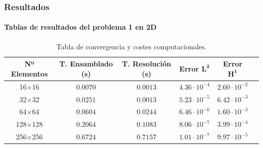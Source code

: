\documentclass[compress]{beamer}
\begin{document}
\begin{frame}
	\frametitle{Resultados}
	\framesubtitle{Tablas de resultados del problema 1 en 2D}
	\scriptsize
	\begin{table}[htbp]
		\centering
		\setlength{\tabcolsep}{4pt} %
		\caption{Tabla de convergencia y costes computacionales.}
		\vspace{-0.2cm}
		\begin{tabular}{cccccc}
			\toprule
			\textbf{Nº Elementos} & \textbf{T. Ensamblado (s)} & \textbf{T. Resolución (s)} & \textbf{Error} $\boldsymbol{L^2}$ & \textbf{Error} $\boldsymbol{H^1}$ \\
			\midrule
			16$\times$16  & $0.0070$ & $0.0013$ & $4.36 \cdot 10^{-4}$ & $2.60 \cdot 10^{-2}$ \\
			32$\times$32  & $0.0251$ & $0.0013$ & $5.23 \cdot 10^{-5}$ & $6.42 \cdot 10^{-3}$ \\
			64$\times$64  & $0.0604$ & $0.0244$ & $6.46 \cdot 10^{-6}$ & $1.60 \cdot 10^{-3}$ \\
			128$\times$128 & $0.2064$ & $0.1083$ & $8.06 \cdot 10^{-7}$ & $3.99 \cdot 10^{-4}$ \\
			256$\times$256 & $0.6724$ & $0.7157$ & $1.01 \cdot 10^{-7}$ & $9.97 \cdot 10^{-5}$ \\
			\bottomrule
		\end{tabular}
	\end{table}
\end{frame}
\end{document}
